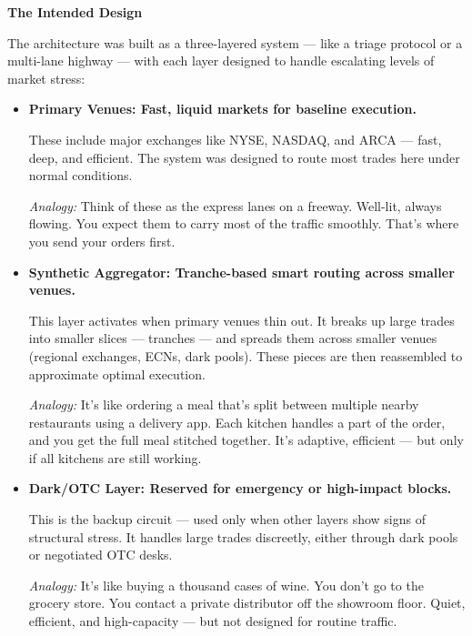   \medskip
  
  \textbf{The Intended Design}

  The architecture was built as a three-layered system — like a triage protocol or a multi-lane highway — with each 
  layer designed to handle escalating levels of market stress:
  
  \begin{itemize}
  
    \item \textbf{Primary Venues: Fast, liquid markets for baseline execution.}
  
    These include major exchanges like NYSE, NASDAQ, and ARCA — fast, deep, and efficient. The system was designed 
    to route most trades here under normal conditions.
  
    \textit{Analogy:} Think of these as the express lanes on a freeway. Well-lit, always flowing. You expect them to 
    carry most of the traffic smoothly. That’s where you send your orders first.
  
    \medskip
  
    \item \textbf{Synthetic Aggregator: Tranche-based smart routing across smaller venues.}
  
    This layer activates when primary venues thin out. It breaks up large trades into smaller slices — tranches — 
    and spreads them across smaller venues (regional exchanges, ECNs, dark pools). These pieces are then reassembled 
    to approximate optimal execution.
  
    \textit{Analogy:} It’s like ordering a meal that’s split between multiple nearby restaurants using a delivery app. 
    Each kitchen handles a part of the order, and you get the full meal stitched together. It’s adaptive, efficient — 
    but only if all kitchens are still working.
  
    \medskip
  
    \item \textbf{Dark/OTC Layer: Reserved for emergency or high-impact blocks.}
  
    This is the backup circuit — used only when other layers show signs of structural stress. It handles large trades 
    discreetly, either through dark pools or negotiated OTC desks.
  
    \textit{Analogy:} It’s like buying a thousand cases of wine. You don’t go to the grocery store. You contact a private 
    distributor off the showroom floor. Quiet, efficient, and high-capacity — but not designed for routine traffic.
  
  \end{itemize}
  
